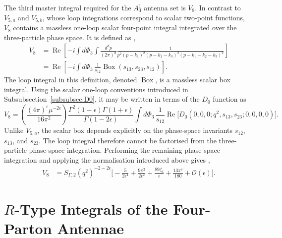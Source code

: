 The third master integral required for the $A_3^1$ antenna set is $V_8$. In contrast to
$V_{5,a}$ and $V_{5,b}$, whose loop integrations correspond to scalar two-point functions,
$V_8$ contains a massless one-loop scalar four-point integral integrated over the
three-particle phase space. It is defined as \cite{Gehrmann-DeRidder:2005btv},
\begin{equation}
    \begin{split}
        V_8 &= \operatorname{Re}\!\left[-i\int d\Phi_3\int\frac{d^dp}{(2\pi)^d}\frac1{p^2(p-k_1)^2(p-k_1-k_3)^2(p-k_1-k_2-k_3)^2}\right]\\
            &= \operatorname{Re}\!\left[-i\int d\Phi_3\,\frac1{s_{12}}\operatorname{Box}(s_{13}, s_{23}, s_{12})\right].
    \end{split}
\end{equation}
The loop integral in this definition, denoted $\operatorname{Box}$, is a massless scalar box integral. Using the scalar
one-loop conventions introduced in Subsubsection~\ref{subsubsec:D0}, it may be written in
terms of the $D_0$ function as
\begin{equation}
    V_8 = \left(\frac{(4\pi)^\epsilon\mu^{-2\epsilon}}{16\pi^2}\right)\frac{\Gamma^2(1-\epsilon)\Gamma(1+\epsilon)}{\Gamma(1-2\epsilon)}\int d\Phi_3\,\frac1{s_{12}}\operatorname{Re}\Big[D_0\!\left(0,0,0;q^2,s_{13},s_{23};0,0,0,0\right)\Big].
\end{equation}
Unlike $V_{5,a}$, the scalar box depends explicitly on the phase-space invariants $s_{12}$,
$s_{13}$, and $s_{23}$. The loop integral therefore cannot be factorised from the
three-particle phase-space integration. Performing the remaining phase-space integration and
applying the normalisation introduced above gives \cite{Gehrmann-DeRidder:2005btv},
\begin{equation}
    \begin{split}
        V_8 &= S_{\Gamma,2}\!\left(q^2\right)^{-2-2\epsilon}\Big[-\frac5{2\epsilon^4}+\frac{9\pi^2}{2\epsilon^2}+\frac{89\zeta_3}{\epsilon}+\frac{13\pi^4}{180}+\mathcal O(\epsilon)\Big].
    \end{split}
\end{equation}

\section{$R$-Type Integrals of the Four-Parton Antennae}\label{sec:MIfourParton}


